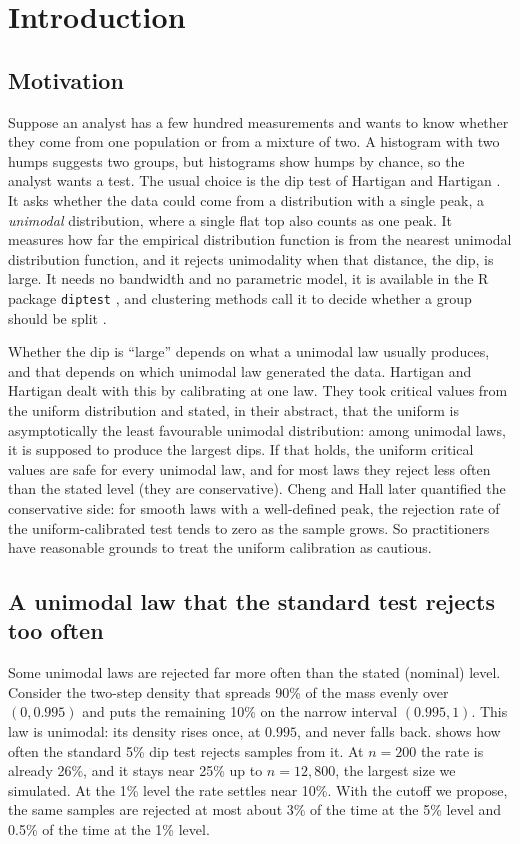 \section{Introduction}\label{sec:intro}

\subsection{Motivation}
Suppose an analyst has a few hundred measurements and wants to know whether they come from one population or from a mixture of two. A histogram with two humps suggests two groups, but histograms show humps by chance, so the analyst wants a test. The usual choice is the dip test of Hartigan and Hartigan \cite{HH85}. It asks whether the data could come from a distribution with a single peak, a \emph{unimodal} distribution, where a single flat top also counts as one peak. It measures how far the empirical distribution function is from the nearest unimodal distribution function, and it rejects unimodality when that distance, the dip, is large. It needs no bandwidth and no parametric model, it is available in the R package \texttt{diptest} \cite{Maechler}, and clustering methods call it to decide whether a group should be split \cite{Maurus16,Bauer23}.

Whether the dip is ``large'' depends on what a unimodal law usually produces, and that depends on which unimodal law generated the data. Hartigan and Hartigan dealt with this by calibrating at one law. They took critical values from the uniform distribution and stated, in their abstract, that the uniform is asymptotically the least favourable unimodal distribution: among unimodal laws, it is supposed to produce the largest dips. If that holds, the uniform critical values are safe for every unimodal law, and for most laws they reject less often than the stated level (they are conservative). Cheng and Hall \cite{CH98} later quantified the conservative side: for smooth laws with a well-defined peak, the rejection rate of the uniform-calibrated test tends to zero as the sample grows. So practitioners have reasonable grounds to treat the uniform calibration as cautious.

\subsection{A unimodal law that the standard test rejects too often}
Some unimodal laws are rejected far more often than the stated (nominal) level. Consider the two-step density that spreads 90\% of the mass evenly over $(0,0.995)$ and puts the remaining 10\% on the narrow interval $(0.995,1)$. This law is unimodal: its density rises once, at $0.995$, and never falls back.  shows how often the standard 5\% dip test rejects samples from it. At $n=200$ the rate is already 26\%, and it stays near 25\% up to $n=12{,}800$, the largest size we simulated. At the 1\% level the rate settles near 10\%. With the cutoff we propose, the same samples are rejected at most about 3\% of the time at the 5\% level and 0.5\% of the time at the 1\% level.

